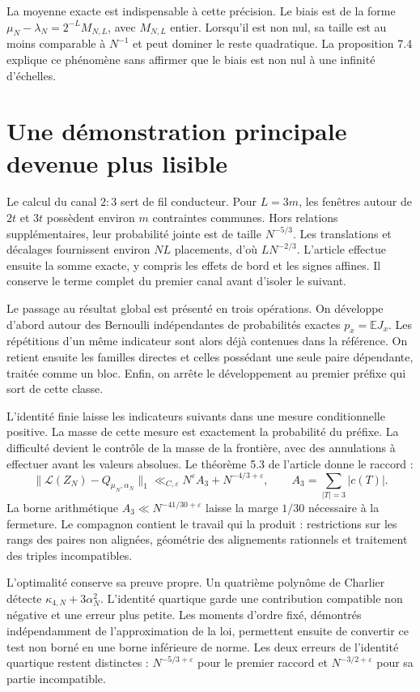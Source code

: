 \documentclass[11pt,a4paper]{article}
\newcommand{\E}{\mathbb E}
\begin{document}
La moyenne exacte est indispensable à cette précision. Le biais est de la forme $\mu_N-\lambda_N=2^{-L}M_{N,L}$, avec $M_{N,L}$ entier. Lorsqu'il est non nul, sa taille est au moins comparable à $N^{-1}$ et peut dominer le reste quadratique. La proposition 7.4 explique ce phénomène sans affirmer que le biais est non nul à une infinité d'échelles.

\section{Une démonstration principale devenue plus lisible}

Le calcul du canal $2:3$ sert de fil conducteur. Pour $L=3m$, les fenêtres autour de $2t$ et $3t$ possèdent environ $m$ contraintes communes. Hors relations supplémentaires, leur probabilité jointe est de taille $N^{-5/3}$. Les translations et décalages fournissent environ $NL$ placements, d'où $LN^{-2/3}$. L'article effectue ensuite la somme exacte, y compris les effets de bord et les signes affines. Il conserve le terme complet du premier canal avant d'isoler le suivant.

Le passage au résultat global est présenté en trois opérations. On développe d'abord autour des Bernoulli indépendantes de probabilités exactes $p_x=\E J_x$. Les répétitions d'un même indicateur sont alors déjà contenues dans la référence. On retient ensuite les familles directes et celles possédant une seule paire dépendante, traitée comme un bloc. Enfin, on arrête le développement au premier préfixe qui sort de cette classe.

L'identité finie laisse les indicateurs suivants dans une mesure conditionnelle positive. La masse de cette mesure est exactement la probabilité du préfixe. La difficulté devient le contrôle de la masse de la frontière, avec des annulations à effectuer avant les valeurs absolues. Le théorème 5.3 de l'article donne le raccord :
\[
 \|\mathcal L(Z_N)-Q_{\mu_N,\alpha_N}\|_1
 \ll_{C,\varepsilon}N^\varepsilon A_3+N^{-4/3+\varepsilon},
 \qquad A_3=\sum_{|T|=3}|c(T)|.
\]
La borne arithmétique $A_3\ll N^{-41/30+\varepsilon}$ laisse la marge $1/30$ nécessaire à la fermeture. Le compagnon contient le travail qui la produit : restrictions sur les rangs des paires non alignées, géométrie des alignements rationnels et traitement des triples incompatibles.

L'optimalité conserve sa preuve propre. Un quatrième polynôme de Charlier détecte $\kappa_{4,N}+3\alpha_N^2$. L'identité quartique garde une contribution compatible non négative et une erreur plus petite. Les moments d'ordre fixé, démontrés indépendamment de l'approximation de la loi, permettent ensuite de convertir ce test non borné en une borne inférieure de norme. Les deux erreurs de l'identité quartique restent distinctes : $N^{-5/3+\varepsilon}$ pour le premier raccord et $N^{-3/2+\varepsilon}$ pour sa partie incompatible.
\end{document}

